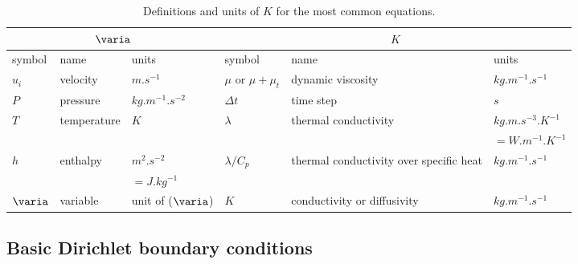 \begin{table}
{\scriptsize
\begin{center}
\begin{tabular}{||l|l|l||l|l|l||}
\hline
\multicolumn{3}{||c||}{$\varia$}&\multicolumn{3}{|c||}{$K$}\\
\hline
symbol                            & name                              & units                    &
symbol                            & name                              & units                  \\
\hline
$u_i$                             & velocity                          & $m.s^{-1}$                &
$\mu$ or $\mu+\mu_t$              & dynamic viscosity                 & $kg.m^{-1}.s^{-1}$     \\
$P$                               & pressure                          & $kg.m^{-1}.s^{-2}$       &
$\Delta t$                     & time step                         & $s$                      \\
$T$                               & temperature                       & $K$                        &
$\lambda$                    & thermal conductivity              & $kg.m.s^{-3}.K^{-1}$ \\
                                  &                                   &                            &
                                  &                                   & $=W.m^{-1}.K^{-1}$\\
$h$                               & enthalpy                          & $m^{2}.s^{-2}$&
$\lambda/C_p$              & thermal conductivity over specific heat  & $kg.m^{-1}.s^{-1}$     \\
                                  &                                   & $=J.kg^{-1}$&
                                  &                                   &                          \\
$\varia$                     & variable                          & unit of ($\varia$)               &
$K  $                          & conductivity or diffusivity       & $kg.m^{-1}.s^{-1}$     \\
\hline
\end{tabular}
\end{center}
}
\caption{Definitions and units of $K$ for the most common equations.}\label{tab:bdncnd:diffusivity}
\end{table}

\subsection{Basic Dirichlet boundary conditions}\label{sec:bndcnd:dirichlet_bc}

